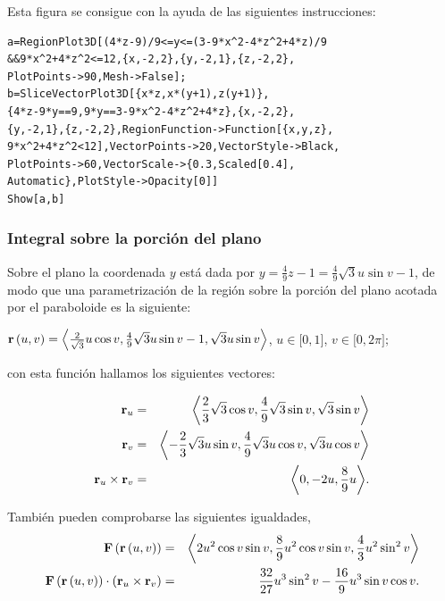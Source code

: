 Esta figura se consigue con la ayuda de las siguientes instrucciones:

\begin{tcolorbox}[title=\bf Instrucción \verb"Mathematica"]\begin{Verbatim}[formatcom=\letraverbatim]
a=RegionPlot3D[(4*z-9)/9<=y<=(3-9*x^2-4*z^2+4*z)/9
&&9*x^2+4*z^2<=12,{x,-2,2},{y,-2,1},{z,-2,2},
PlotPoints->90,Mesh->False];
b=SliceVectorPlot3D[{x*z,x*(y+1),z(y+1)},
{4*z-9*y==9,9*y==3-9*x^2-4*z^2+4*z},{x,-2,2},
{y,-2,1},{z,-2,2},RegionFunction->Function[{x,y,z},
9*x^2+4*z^2<12],VectorPoints->20,VectorStyle->Black,
PlotPoints->60,VectorScale->{0.3,Scaled[0.4],
Automatic},PlotStyle->Opacity[0]]
Show[a,b]
\end{Verbatim}
\end{tcolorbox}

\subsubsection{Integral sobre la porción del plano}

Sobre el plano la coordenada $y$ está dada por
$y=\frac{4}{9}z-1=\frac{4}{9}\sqrt{3}u\sin v-1$,
de modo que una parametrización de la región sobre la porción del plano acotada por el paraboloide es la siguiente:

${\bf r}\left( u,v\right) =\left\langle \frac{2}{\sqrt{3}}u\cos v,\frac{4}{9}\sqrt{3}u\sin v-1,\sqrt{3}u\sin v\right\rangle$,
$u\in \lbrack 0,1]$, $v\in\lbrack 0,2\pi ];$

con esta función hallamos los siguientes vectores:

{\small
\begin{eqnarray*}
{\bf r}_{u} &=&\left\langle \frac{2}{3}\sqrt{3}\cos v,\frac{4}{9}\sqrt{3}\sin v,\sqrt{3}\sin v\right\rangle \\
{\bf r}_{v}&=&\left\langle -\frac{2}{3}\sqrt{3}u\sin v,\frac{4}{9}\sqrt{3}u\cos v,\sqrt{3}u\cos v\right\rangle \\
{\bf r}_{u}\times {\bf r}_{v}&=& %
\left\langle 0,-2u,\frac{8}{9}u\right\rangle\!.
\end{eqnarray*}
}

También pueden comprobarse las siguientes igualdades,
{\small
\begin{eqnarray*}
{\bf F}\left( {\bf r}\left( u,v\right) \right) &=& \left\langle 2u^{2}\cos v\sin v,\frac{8}{9}u^{2}\cos v\sin v,\frac{4}{3}u^{2}\sin ^{2}v \right\rangle  \\
{\bf F}\left( {\bf r}\left( u,v\right) \right) \cdot \left( {\bf r}_{u}\times {\bf r}_{v}\right)
&=& %
\frac{32}{27}u^{3}\sin ^{2}v-\frac{16}{9}u^{3}\sin v\cos v.
\end{eqnarray*}
}

